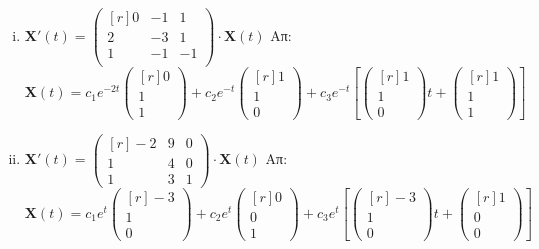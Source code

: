 \begin{enumerate}
\begin{enumerate}[i)]
      \item $ \mathbf{X}'(t) = 
        \begin{pmatrix*}[r]
          0 & -1 & 1 \\
          2 & -3 & 1 \\
          1 & -1 & -1 \\
        \end{pmatrix*} \cdot 
        \mathbf{X}(t) $
        \hfill Απ: {\scriptsize $ \mathbf{X}(t) =  c_{1}e^{-2t} 
          \begin{pmatrix*}[r] 0 \\ 1 \\ 1 \end{pmatrix*} + c_{2}e^{-t} 
          \begin{pmatrix*}[r] 1 \\ 1 \\ 0  \end{pmatrix*} + c_{3} e^{-t} \left[ 
            \begin{pmatrix*}[r] 1 \\ 1 \\ 0 \end{pmatrix*}t +  
        \begin{pmatrix*}[r] 1 \\ 1 \\ 1 \end{pmatrix*}\right] $}

      \item $ \mathbf{X}'(t) = 
        \begin{pmatrix*}[r]
          -2 & 9 & 0 \\
          1 & 4 & 0 \\
          1 & 3 & 1
        \end{pmatrix*} \cdot 
        \mathbf{X}(t) $
        \hfill Απ: {\scriptsize $ \mathbf{X}(t) = c_{1}e^{t} 
          \begin{pmatrix*}[r] -3 \\ 1 \\ 0 \end{pmatrix*} + c_{2} e^{t}
          \begin{pmatrix*}[r] 0 \\ 0 \\ 1 \end{pmatrix*} + c_{3} e^{t} \left[
            \begin{pmatrix*}[r] -3 \\ 1 \\ 0 \end{pmatrix*}t +
        \begin{pmatrix*}[r] 1 \\ 0 \\ 0 \end{pmatrix*} \right] $}


\end{enumerate}
\end{enumerate}
